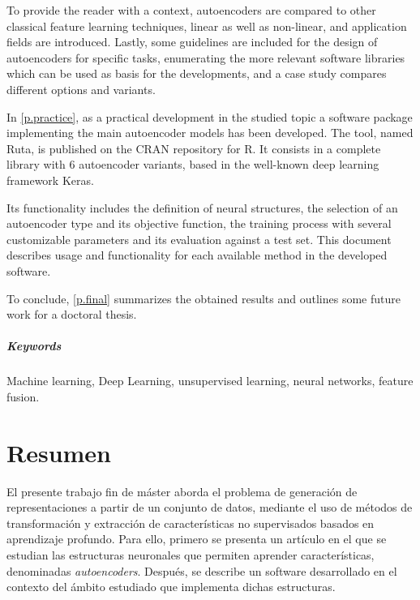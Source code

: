 \documentclass[oneside,openright,titlepage,numbers=noenddot,openany,headinclude,footinclude=true,
cleardoublepage=empty,abstractoff,BCOR=5mm,paper=a4,fontsize=12pt,main=spanish]{scrreprt}
\DeclareRobustCommand{\chaptertitle}[1]{\textls[80]{\scshape #1}}
\begin{document}
To provide the reader with a context, autoencoders are compared to other classical feature learning techniques, linear as well as non-linear, and application fields are introduced. Lastly, some guidelines are included for the design of autoencoders for specific tasks, enumerating the more relevant software libraries which can be used as basis for the developments, and a case study compares different options and variants.


In \autoref{p.practice}, as a practical development in the studied topic a software package implementing the main autoencoder models has been developed. The tool, named Ruta,  is published on the CRAN repository for R. It consists in a complete library with 6 autoencoder variants, based in the well-known deep learning framework Keras.

Its functionality includes the definition of neural structures, the selection of an autoencoder type and its objective function, the training process with several customizable parameters and its evaluation against a test set. This document describes usage and functionality for each available method in the developed software.

To conclude, \autoref{p.final} summarizes the obtained results and outlines some future work for a doctoral thesis. 

\paragraph{Keywords} Machine learning, Deep Learning, unsupervised learning, neural networks, feature fusion.

\chapter*{Resumen}
\addcontentsline{toc}{chapter}{\chaptertitle{resumen}}

El presente trabajo fin de máster aborda el problema de generación de representaciones a partir de un conjunto de datos, mediante el uso de métodos de transformación y extracción de características no supervisados basados en aprendizaje profundo. Para ello, primero se presenta un artículo en el que se estudian las estructuras neuronales que permiten aprender características, denominadas \textit{autoencoders}. Después, se describe un software desarrollado en el contexto del ámbito estudiado que implementa dichas estructuras.
\end{document}
